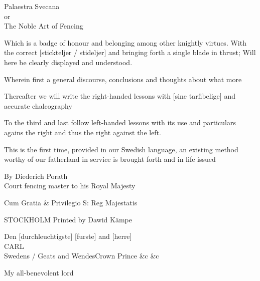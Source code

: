 \cleartoleftpage


\newpage

Palaestra Svecana \\
or \\
The Noble Art of Fencing

Which is a badge of honour and belonging among other knightly virtues. With the correct [stickteljer / stideljer] and bringing forth a single blade in thrust; Will here be clearly displayed and understood.

Wherein first a general discourse, conclusions and thoughts about what
more 

Thereafter we will write the right-handed lessons with [sine
tarfibelige] and accurate chalcography

To the third and last follow left-handed lessons with its use and particulars agains the right and thus the right against the left.


This is the first time, provided in our Swedish language, an existing
method worthy of our fatherland in service is brought forth and in
life issued

By Diederich Porath \\
Court fencing master to his Royal Majesty

Cum Gratia \& Privilegio S: Reg Majestatis

STOCKHOLM Printed by Dawid Kämpe

\newpage 


\newpage

Den [durchleuchtigste] [furste] and [herre] \\
CARL \\
Swedens / Geats and WendesCrown Prince \&c \&c

My all-benevolent lord

